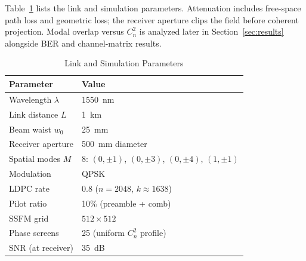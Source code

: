 \documentclass[journal]{IEEEtran}
\begin{document}
Table~\ref{tab:link_params} lists the link and simulation parameters. Attenuation includes free-space path loss and geometric loss; the receiver aperture clips the field before coherent projection. Modal overlap versus $C_n^2$ is analyzed later in Section~\ref{sec:results} alongside BER and channel-matrix results.

\begin{table}[htbp]
\centering
\caption{Link and Simulation Parameters}
\label{tab:link_params}
\small
\renewcommand{\arraystretch}{1.1}
\begin{tabular}{l l}
\toprule
\textbf{Parameter} & \textbf{Value} \\
\midrule
Wavelength $\lambda$ & 1550~nm \\
Link distance $L$ & 1~km \\
Beam waist $w_0$ & 25~mm \\
Receiver aperture & 500~mm diameter \\
Spatial modes $M$ & 8: $(0,\pm1)$, $(0,\pm3)$, $(0,\pm4)$, $(1,\pm1)$ \\
Modulation & QPSK \\
LDPC rate & 0.8 ($n=2048$, $k \approx 1638$) \\
Pilot ratio & 10\% (preamble + comb) \\
SSFM grid & $512 \times 512$ \\
Phase screens & 25 (uniform $C_n^2$ profile) \\
SNR (at receiver) & 35~dB \\
\bottomrule
\end{tabular}
\end{table}
\end{document}
